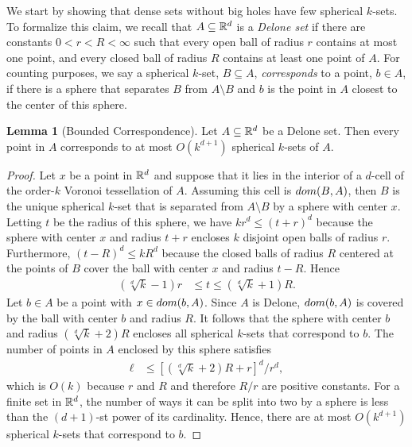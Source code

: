 \documentclass[a4paper]{article}
\newcommand {\mm}[1]   {\ifmmode{#1}\else{\mbox{\(#1\)}}\fi}
\newcommand{\Rspace}        {\mm{{\mathbb R}}}
\newcommand{\domain}[2]     {\mm{{\rm dom}{({#1},{#2})}}}
\theoremstyle{definition}
\numberwithin{theorem}{section}
\newtheorem{lemma}[theorem]{Lemma}
\numberwithin{equation}{section}
\begin{document}
We start by showing that dense sets without big holes have few spherical $k$-sets. To formalize this claim, we recall that $A \subseteq \Rspace^d$ is a \emph{Delone set} if there are constants $0 < r < R < \infty$ such that every open ball of radius $r$ contains at most one point, and every closed ball of radius $R$ contains at least one point of $A$.
For counting purposes, we say a spherical $k$-set, $B \subseteq A$, \emph{corresponds} to a point, $b \in A$, if there is a sphere that separates $B$ from $A \setminus B$ and $b$ is the point in $A$ closest to the center of this sphere.
\begin{lemma}[Bounded Correspondence]
  \label{lem:bounded_correspondence}
  Let $A \subseteq \Rspace^d$ be a Delone set.
  Then every point in $A$ corresponds to at most $O( k^{d+1} )$ spherical $k$-sets of $A$.
\end{lemma}
\begin{proof}
  Let $x$ be a point in $\Rspace^d$ and suppose that it lies in the interior of a $d$-cell of the order-$k$ Voronoi tessellation of $A$.
  Assuming this cell is $\domain{B}{A}$, then $B$ is the unique spherical $k$-set that is separated from $A \setminus B$ by a sphere with center $x$.
  Letting $t$ be the radius of this sphere, we have $k r^d \leq (t+r)^d$ because the sphere with center $x$ and radius $t+r$ encloses $k$ disjoint open balls of radius $r$.
  Furthermore, $(t-R)^d \leq k R^d$ because the closed balls of radius $R$ centered at the points of $B$ cover the ball with center $x$ and radius $t-R$.
  Hence
  \begin{align}
    (\sqrt[d]{k} - 1) r  &\leq  t  \leq  (\sqrt[d]{k} + 1) R .
  \end{align}
  Let $b \in A$ be a point with $x \in \domain{b}{A}$.
  Since $A$ is Delone, $\domain{b}{A}$ is covered by the ball with center $b$ and radius $R$.
  It follows that the sphere with center $b$ and radius $(\sqrt[d]{k} + 2) R$ encloses all spherical $k$-sets that correspond to $b$.
  The number of points in $A$ enclosed by this sphere satisfies
  \begin{align}
    \ell  &\leq  \left[ \left( \sqrt[d]{k} + 2 \right) R + r \right]^d / r^d ,
  \end{align}
  which is $O(k)$ because $r$ and $R$ and therefore $R/r$ are positive constants.
  For a finite set in $\Rspace^d$, the number of ways it can be split into two by a sphere is less than the $(d+1)$-st power of its cardinality.
  Hence, there are at most $O(k^{d+1})$ spherical $k$-sets that correspond to $b$.
\end{proof}
\end{document}
